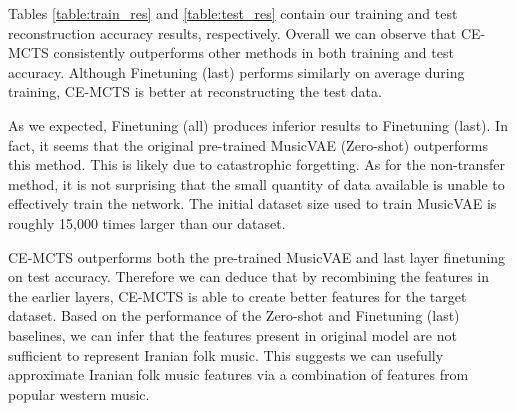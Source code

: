 \documentclass[letterpaper]{article}
\begin{document}
\begin{table}[h]
    \centering
    \caption{Test reconstruction accuracy of each approach on each fold}
    \label{table:test_res}
\end{table}

Tables \ref{table:train_res} and \ref{table:test_res} contain our training and test reconstruction accuracy results, respectively. 
Overall we can observe that CE-MCTS consistently outperforms other methods in both training and test accuracy. Although Finetuning (last) performs similarly on average during training, CE-MCTS is better at reconstructing the test data. 

As we expected, Finetuning (all) produces inferior results to Finetuning (last). In fact, it seems that the original pre-trained MusicVAE (Zero-shot) outperforms this method. This is likely due to catastrophic forgetting. As for the non-transfer method, it is not surprising that the small quantity of data available is unable to effectively train the network. The initial dataset size used to train MusicVAE is roughly 15,000 times larger than our dataset.

CE-MCTS outperforms both the pre-trained MusicVAE and last layer finetuning on test accuracy. Therefore we can deduce that by recombining the features in the earlier layers, CE-MCTS is able to create better features for the target dataset. Based on the performance of the Zero-shot and Finetuning (last) baselines, we can infer that the features present in original model are not sufficient to represent Iranian folk music.
This suggests we can usefully approximate Iranian folk music features via a combination of features from popular western music.
\end{document}
